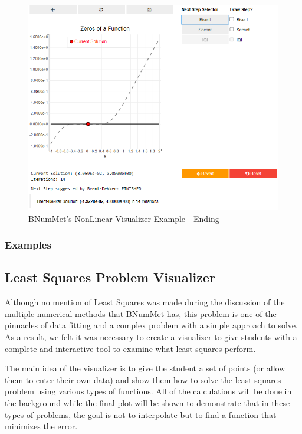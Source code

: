 \begin{figure}[H]
    \centering
    \includegraphics[width=\textwidth]{Include/Images/Thesis/Development/Visualizers/NON LINEAR VISUALIZER/BNumMet.NonLinear.Ex1.2.png}
    \caption{BNumMet's NonLinear Visualizer Example - Ending }
    \label{fig:BNumMet's NonLinear Visualizer Example - Ending }
\end{figure}
\subsubsection{Examples}
	


\subsection{Least Squares Problem Visualizer}
Although no mention of Least Squares was made during the discussion of the multiple numerical methods that BNumMet has, this problem is one of the pinnacles of data fitting and a complex problem with a simple approach to solve. As a result, we felt it was necessary to create a visualizer to give students with a complete and interactive tool to examine what least squares perform.

The main idea of the visualizer is to give the student a set of points (or allow them to enter their own data) and show them how to solve the least squares problem using various types of functions. All of the calculations will be done in the background while the final plot will be shown to demonstrate that in these types of problems, the goal is not to interpolate but to find a function that minimizes the error.

